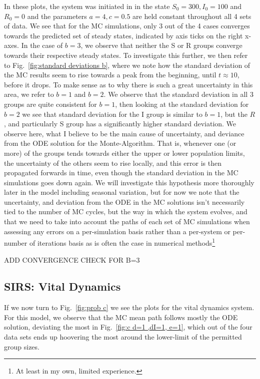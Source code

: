 \documentclass[10pt,showpacs,preprintnumbers,amsmath,amssymb,nofootinbib,aps,prl,twocolumn,groupedaddress,superscriptaddress,showkeys]{revtex4-1}
\begin{document}
    In these plots, the system was initiated in in the state $S_0 = 300, I_0=100$ and $R_0=0$ and the parameters $a=4, c=0.5$ are held constant throughout all 4 sets of data. We see that for the MC simulations, only 3 out of the 4 cases converges towards the predicted set of steady states, indicated by axis ticks on the right x-axes. In the case of $b=3$, we observe that neither the S or R groups converge towards their respective steady states. To investigate this further, we then refer to Fig.~\ref{fig:standard deviations b}, where we note how the standard deviation of the MC results seem to rise towards a peak from the beginning, until $t\approx10$, before it drops. To make sense as to why there is such a great uncertainty in this area, we refer to $b=1$ and $b=2$. We observe that the standard deviation in all 3 groups are quite consistent for $b=1$, then looking at the standard deviation for $b=2$  we see that standard deviation for the I group is similar to $b=1$, but the $R$, and particularly S group has a significantly higher standard deviation. We observe here, what I believe to be the main cause of uncertainty, and deviance from the ODE solution for the Monte-Algorithm. That is, whenever one (or more) of the groups tends towards either the upper or lower population limits, the uncertainty of the others seem to rise locally, and this error is then propagated forwards in time, even though the standard deviation in the MC simulations goes down again. We will investigate this hypothesis more thoroughly later in the model including seasonal variation, but for now we note that the uncertainty, and deviation from the ODE in the MC solutions isn't necessarily tied to the number of MC cycles, but the way in which the system evolves, and that we need to take into account the paths of each set of MC simulations when assessing any errors on a per-simulation basis rather than a per-system or per-number of iterations basis as is often the case in numerical methods\footnote{At least in my own, limited experience.}

    ADD CONVERGENCE CHECK FOR B=3

  \subsection{SIRS: Vital Dynamics}
    If we now turn to Fig.~\ref{fig:prob c} we see the plots for the vital dynamics system.
    For this model, we observe that the MC mean path follows mostly the ODE solution, deviating the most in Fig.~\ref{fig:c d=1 ,dI=1, e=1}, which out of the four data sets ends up hoovering the most around the lower-limit of the permitted group sizes.
\end{document}

